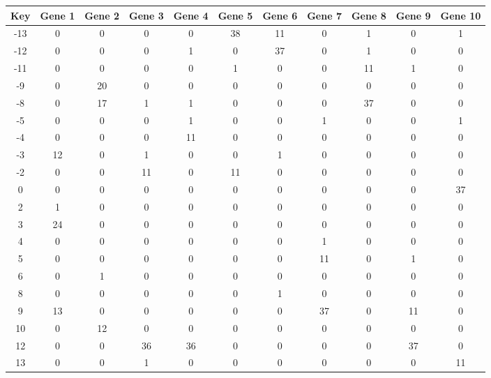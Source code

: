 \begin{tabular}{|c|c|c|c|c|c|c|c|c|c|c|}
\hline
Key & Gene 1 & Gene 2 & Gene 3 & Gene 4 & Gene 5 & Gene 6 & Gene 7 & Gene 8 & Gene 9 & Gene 10 \\
\hline
-13 & 0 & 0 & 0 & 0 & 38 & 11 & 0 & 1 & 0 & 1 \\
-12 & 0 & 0 & 0 & 1 & 0 & 37 & 0 & 1 & 0 & 0 \\
-11 & 0 & 0 & 0 & 0 & 1 & 0 & 0 & 11 & 1 & 0 \\
-9 & 0 & 20 & 0 & 0 & 0 & 0 & 0 & 0 & 0 & 0 \\
-8 & 0 & 17 & 1 & 1 & 0 & 0 & 0 & 37 & 0 & 0 \\
-5 & 0 & 0 & 0 & 1 & 0 & 0 & 1 & 0 & 0 & 1 \\
-4 & 0 & 0 & 0 & 11 & 0 & 0 & 0 & 0 & 0 & 0 \\
-3 & 12 & 0 & 1 & 0 & 0 & 1 & 0 & 0 & 0 & 0 \\
-2 & 0 & 0 & 11 & 0 & 11 & 0 & 0 & 0 & 0 & 0 \\
0 & 0 & 0 & 0 & 0 & 0 & 0 & 0 & 0 & 0 & 37 \\
2 & 1 & 0 & 0 & 0 & 0 & 0 & 0 & 0 & 0 & 0 \\
3 & 24 & 0 & 0 & 0 & 0 & 0 & 0 & 0 & 0 & 0 \\
4 & 0 & 0 & 0 & 0 & 0 & 0 & 1 & 0 & 0 & 0 \\
5 & 0 & 0 & 0 & 0 & 0 & 0 & 11 & 0 & 1 & 0 \\
6 & 0 & 1 & 0 & 0 & 0 & 0 & 0 & 0 & 0 & 0 \\
8 & 0 & 0 & 0 & 0 & 0 & 1 & 0 & 0 & 0 & 0 \\
9 & 13 & 0 & 0 & 0 & 0 & 0 & 37 & 0 & 11 & 0 \\
10 & 0 & 12 & 0 & 0 & 0 & 0 & 0 & 0 & 0 & 0 \\
12 & 0 & 0 & 36 & 36 & 0 & 0 & 0 & 0 & 37 & 0 \\
13 & 0 & 0 & 1 & 0 & 0 & 0 & 0 & 0 & 0 & 11 \\
\hline
\end{tabular}